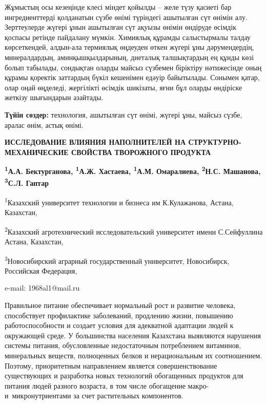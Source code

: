 Жұмыстың осы кезеңінде клесі міндет қойылды -- желе түзу қасиеті бар
ингредиенттерді қолданатын сүзбе өнімі түріндегі ашытылған сүт өнімін
алу. Зерттеулерде жүгері ұнын ашытылған сүт ақуызы өнімін өндіруде
өсімдік қоспасы ретінде пайдалану мүмкін. Химиялық құрамды салыстырмалы
талдау көрсеткендей, алдын-ала термиялық өңдеуден өткен жүгері ұны
дәрумендердің, минералдардың, аминқышқылдарының, диеталық талшықтардың
ең құнды көзі болып табылады, сондықтан оларды майсыз сүзбемен біріктіру
нәтижесінде оның құрамы қоректік заттардың бүкіл кешенімен едәуір
байытылады. Сонымен қатар, олар оңай өңделеді, жергілікті өсімдік
шикізаты, яғни бұл оларды өндіріске жеткізу шығындарын азайтады.

{\bfseries Түйін сөздер:} технология, ашытылған сүт өнімі, жүгері ұны,
майсыз сүзбе, аралас өнім, астық өнімі.

\begin{articleheader}
{\bfseries ИССЛЕДОВАНИЕ ВЛИЯНИЯ НАПОЛНИТЕЛЕЙ НА СТРУКТУРНО-МЕХАНИЧЕСКИЕ СВОЙСТВА ТВОРОЖНОГО ПРОДУКТА}

{\bfseries
\textsuperscript{1}А.А. Бектурганова\textsuperscript{\envelope },
\textsuperscript{1}А.Ж. Хастаева,
\textsuperscript{1}А.М. Омаралиева,
\textsuperscript{2}Н.С. Машанова,
\textsuperscript{3}С.Л. Гаптар
}
\end{articleheader}

\begin{affiliation}
\textsuperscript{1}Казахский университет технологии и бизнеса им К.Кулажанова, Астана, Казахстан,

\textsuperscript{2}Казахский агротехнический исследовательский университет имени С.Сейфуллина Астана, Казахстан,

\textsuperscript{3}Новосибирский аграрный государственный университет, Новосибирск, Российская Федерация,

e-mail: 1968al1@mail.ru
\end{affiliation}

Правильное питание обеспечивает нормальный рост и развитие человека,
способствует профилактике заболеваний, продлению жизни, повышению
работоспособности и создает условия для адекватной адаптации людей к
окружающей среде. У большинства населения Казахстана выявляются
нарушения системы питания, обусловленные недостаточным потреблением
витаминов, минеральных веществ, полноценных белков и нерациональным их
соотношением. Поэтому, приоритетным направлением является
совершенствование существующих и разработка новых технологий обогащенных
продуктов для питания людей разного возраста, в том числе обогащение
макро- и~микронутриентами за счет растительных компонентов.

